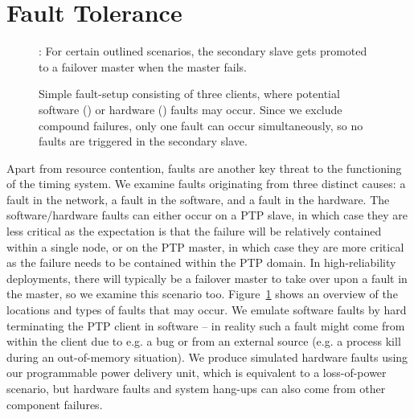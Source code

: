 
\section{Fault Tolerance}
\newcommand{\faultLength}{30 seconds}

\begin{figure}
    \begin{center}
    \end{center}

    \scriptsize *: For certain outlined scenarios, the secondary slave gets promoted to a failover master when the master fails.

    \caption{
        Simple fault-setup consisting of three clients, where potential software (\faBug{}) or hardware (\faBolt{}) faults may occur. Since we exclude compound failures, only one fault can occur simultaneously, so no faults are triggered in the secondary slave.
    }
    \label{fig:fault_architecture}
\end{figure}

Apart from resource contention, faults are another key threat to the functioning of the timing system. We examine faults originating from three distinct causes: a fault in the network, a fault in the software, and a fault in the hardware. The software/hardware faults can either occur on a PTP slave, in which case they are less critical as the expectation is that the failure will be relatively contained within a single node, or on the PTP master, in which case they are more critical as the failure needs to be contained within the PTP domain. In high-reliability deployments, there will typically be a failover master to take over upon a fault in the master, so we examine this scenario too. Figure~\ref{fig:fault_architecture} shows an overview of the locations and types of faults that may occur. We emulate software faults by hard terminating the PTP client in software -- in reality such a fault might come from within the client due to e.g. a bug or from an external source (e.g. a process kill during an out-of-memory situation). We produce simulated hardware faults using our programmable power delivery unit, which is equivalent to a loss-of-power scenario, but hardware faults and system hang-ups can also come from other component failures.


